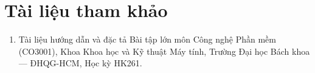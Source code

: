 \section*{Tài liệu tham khảo}

\begin{enumerate}
    \item Tài liệu hướng dẫn và đặc tả Bài tập lớn môn Công nghệ Phần mềm (CO3001), Khoa Khoa học và Kỹ thuật Máy tính, Trường Đại học Bách khoa --- ĐHQG-HCM, Học kỳ HK261.
\end{enumerate}
